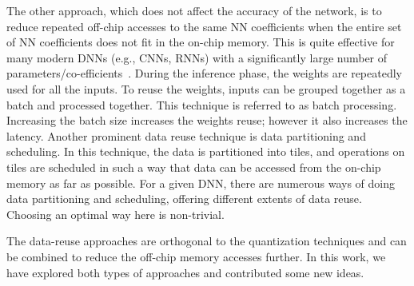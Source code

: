 \documentclass[a4paper,10pt]{article}
\begin{document}
The other approach, which does not affect the accuracy of the network, is to reduce repeated off-chip accesses to the same NN coefficients when the entire set of NN coefficients does not fit in the on-chip memory. This is quite effective for many modern DNNs (e.g., CNNs, RNNs) with a significantly large number of parameters/co-efficients~\cite{zhang2015optimizing,Li2018SmartShuttleOO,que2019efficient,park2020time}. During the inference phase, the weights are repeatedly used for all the inputs. To reuse the weights, inputs can be grouped together as a batch and processed together. This technique is referred to as batch processing. Increasing the batch size increases the weights reuse; however it also increases the latency. Another prominent data reuse technique is data partitioning and scheduling. In this technique, the data is partitioned into tiles, and operations on tiles are scheduled in such a way that data can be accessed from the on-chip memory as far as possible. For a given DNN, there are numerous ways of doing data partitioning and scheduling, offering different extents of data reuse. Choosing an optimal way here is non-trivial.

The data-reuse approaches are orthogonal to the quantization techniques and can be combined to reduce the off-chip memory accesses further. In this work, we have explored both types of approaches and contributed some new ideas.
\end{document}
